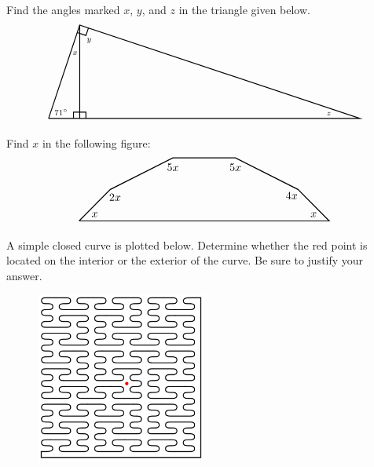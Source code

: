 \documentclass[11pt,letterpaper]{article}
\begin{document}

 Find the angles marked $x$, $y$, and $z$ in the triangle given below. 
	\[
	\begin{tikzpicture}
	\draw[line width=0.03cm] (0,0) -- (1,3) -- (10,0) -- (0,0);
	\draw[line width=0.03cm] (1,3) -- (1,0);
	\draw[line width=0.03cm] (0.8,0) -- (0.8,0.2) -- (1.2,0.2) -- (1.2,0);
	\draw[line width=0.03cm] (0.92,2.76) -- (1.2,2.666) -- (1.2802,2.9066);
	\node at (0.4,0.2) {\scriptsize$71^\circ$};
	\node at (0.85,2.1) {\scriptsize$x$};
	\node at (1.3,2.5) {\scriptsize$y$};
	\node at (9,0.15) {\scriptsize$z$};
	\end{tikzpicture}
	\]



\newpage



 Find $x$ in the following figure:
	\[
	\begin{tikzpicture}
	\draw[line width=0.03cm] (0,0) -- (1,1) -- (3,2) -- (5,2) -- (7,1) -- (8,0) -- (0,0);
	\node at (0.5,0.2) {$x$};
	\node at (1.15,0.75) {$2x$};
	\node at (3,1.7) {$5x$};
	\node at (5,1.7) {$5x$};
	\node at (6.8,0.8) {$4x$};
	\node at (7.5,0.2) {$x$};
	\end{tikzpicture}
	\]



\newpage



 A simple closed curve is plotted below. Determine whether the red point is located on the interior or the exterior of the curve. Be sure to justify your answer.
	\begin{figure}[!ht]
	\centering
	\includegraphics[width=0.5\textwidth]{peanocurve.png}
	\end{figure}
\end{document}

